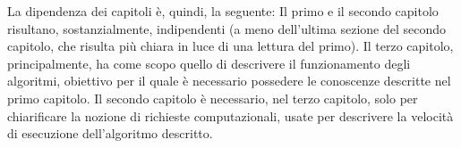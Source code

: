 La dipendenza dei capitoli è, quindi, la seguente:
Il primo e il secondo capitolo risultano, sostanzialmente, indipendenti (a meno dell'ultima sezione del secondo capitolo, che risulta più chiara in luce di una lettura del primo).
Il terzo capitolo, principalmente, ha come scopo quello di descrivere il funzionamento degli algoritmi, obiettivo per il quale è necessario possedere le conoscenze descritte nel primo capitolo.
Il secondo capitolo è necessario, nel terzo capitolo, solo per chiarificare la nozione di richieste computazionali, usate per descrivere la velocità di esecuzione dell'algoritmo descritto.
